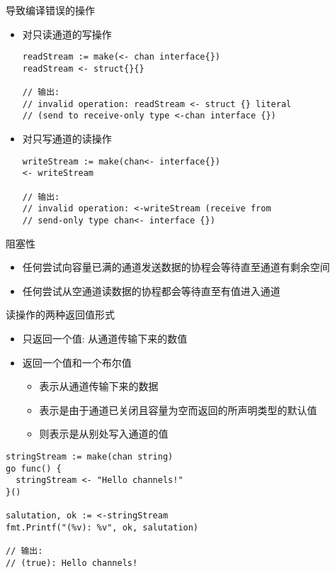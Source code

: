 \begin{frame}[fragile]{导致编译错误的操作}
\begin{itemize}
    \item 对\alert{只读通道}的写操作
\begin{lstlisting}
readStream := make(<- chan interface{})
readStream <- struct{}{}

// 输出:
// invalid operation: readStream <- struct {} literal 
// (send to receive-only type <-chan interface {})    
\end{lstlisting}
        \item\pause 对\alert{只写通道}的读操作
\begin{lstlisting}
writeStream := make(chan<- interface{})
<- writeStream

// 输出:
// invalid operation: <-writeStream (receive from 
// send-only type chan<- interface {})
\end{lstlisting}
\end{itemize}
\end{frame}

\begin{frame}{阻塞性}
    \begin{itemize}
        \item 任何尝试向容量已满的通道发送数据的协程会等待直至通道有剩余空间
        \item 任何尝试从空通道读数据的协程都会等待直至有值进入通道
    \end{itemize}
\end{frame}

\begin{frame}[fragile]{读操作的两种返回值形式}
    \begin{itemize}
        \item 只返回一个值: 从通道传输下来的数值
        \item\pause 返回一个值和一个布尔值
            \begin{itemize}
                \item {}表示从通道传输下来的数据
                \item {}表示是由于通道已关闭且容量为空而返回的所声明类型的默认值
                \item {}则表示是从别处写入通道的值
            \end{itemize}
    \end{itemize}

\begin{lstlisting}[caption={通道的两种读取操作}]
stringStream := make(chan string)
go func() {
  stringStream <- "Hello channels!"
}()

salutation, ok := <-stringStream
fmt.Printf("(%v): %v", ok, salutation)

// 输出:
// (true): Hello channels!
\end{lstlisting}
\end{frame}

